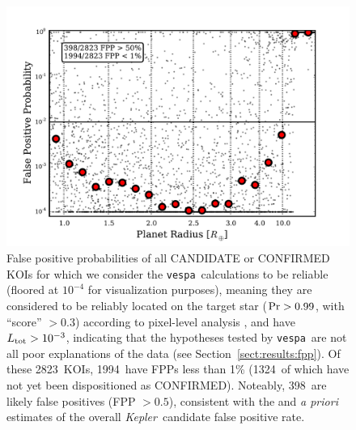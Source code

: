 \documentclass{emulateapj}
\newcommand{\figlabel}[1]{\label{fig:#1}}
\newcommand{\sectionname}{Section}
\newcommand{\Sect}[1]{\sectionname~\ref{sect:#1}}
\newcommand{\sect}[1]{\Sect{#1}}
\newcommand{\nreliable}{2823} %
\newcommand{\nval}{1994} %
\newcommand{\nreliableFP}{398} %
\newcommand{\nvalnew}{1324} %
\newcommand{\posprobthresh}{0.3}
\newcommand{\kepler}{\textit{Kepler}}
\newcommand{\vespa}{\texttt{vespa}}
\begin{document}
\begin{figure}[p]
\begin{center}
\includegraphics[width=7in]{figures/fpp_summary_all.pdf}
\end{center}
\caption{False positive probabilities of all CANDIDATE or CONFIRMED
  KOIs for which we consider the \vespa\ calculations to be reliable
  (floored at $10^{-4}$ for visualization purposes), meaning they are
  considered to be reliably located on the target star ($ {\rm Pr} >
  0.99$, with ``score'' $> \posprobthresh$) according to pixel-level analysis
  \citep{Bryson:KSCI}, and have $L_{\rm tot} > 10^{-3}$, indicating
  that the hypotheses tested by \vespa\ are not all poor explanations
  of the data (see \sect{results:fpp}).  Of these \nreliable\ KOIs,
  \nval\ have FPPs less than 1\% (\nvalnew\ of which have not yet been
  dispositioned as CONFIRMED).  Noteably, \nreliableFP\ are likely
  false positives (FPP $> 0.5$), consistent with the
  \citet{Morton:2011b} and \citet{Fressin:2013} \emph{a priori}
  estimates of the overall \kepler\ candidate false positive rate.
  \figlabel{fppall}}
\end{figure}
\end{document}
